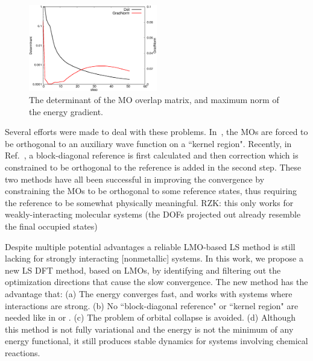 \documentclass[aps,prl,twocolumn,reprint,amsmath,amssymb]{revtex4-1}
\begin{document}

\begin{figure}
\includegraphics[width=0.5\textwidth]{det}
\caption{The determinant of the MO overlap matrix, and maximum norm of the energy gradient. }
\label{fig:det}
\end{figure}

Several efforts were made to deal with these problems. In~\cite{tsuchida2007augmented,tsuchida2008ab}, the MOs are forced to be orthogonal to an auxiliary wave function on a ``kernel region". Recently, in Ref.~, a block-diagonal reference is first calculated and then correction which is constrained to be orthogonal to the reference is added in the second step. These two methods have all been successful in improving the convergence by constraining the MOs to be orthogonal to some reference states, thus requiring the reference to be somewhat physically meaningful. RZK: this only works for weakly-interacting molecular systems (the DOFs projected out already resemble the final occupied states)

Despite multiple potential advantages a reliable LMO-based LS method is still lacking for strongly interacting [nonmetallic] systems. In this work, we propose a new LS DFT method, based on LMOs, by identifying and filtering out the optimization directions that cause the slow convergence. The new method has the advantage that: (a) The energy converges fast, and works with systems where interactions are strong. (b) No ``block-diagonal reference" or ``kernel region" are needed like in \cite{tsuchida2007augmented} or \cite{khaliullin2013efficient}.
(c) The problem of orbital collapse is avoided. (d) Although this method is not fully variational and the energy is not the minimum of any energy functional, it still produces stable dynamics for systems involving chemical reactions. 
\end{document}

